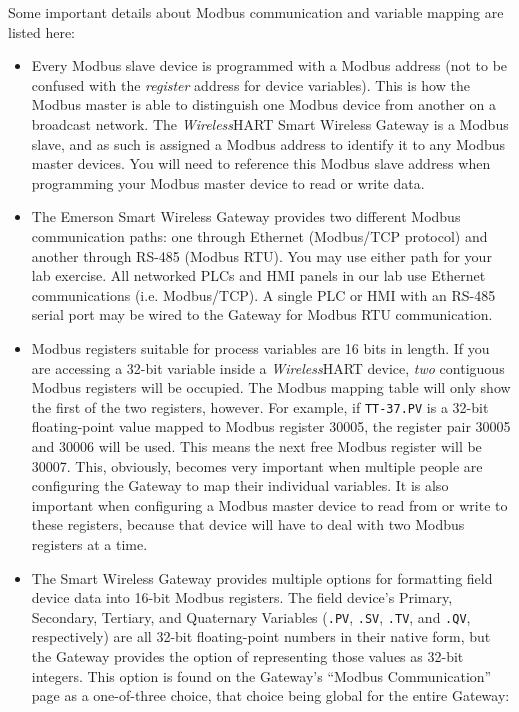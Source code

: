 \vskip 10pt

\filbreak

\noindent
Some important details about Modbus communication and variable mapping are listed here:

\begin{itemize}
\item{} Every Modbus slave device is programmed with a Modbus address (not to be confused with the {\it register} address for device variables).  This is how the Modbus master is able to distinguish one Modbus device from another on a broadcast network.  The {\sl Wireless}HART Smart Wireless Gateway is a Modbus slave, and as such is assigned a Modbus address to identify it to any Modbus master devices.  You will need to reference this Modbus slave address when programming your Modbus master device to read or write data.
\vskip 5pt
\item{} The Emerson Smart Wireless Gateway provides two different Modbus communication paths: one through Ethernet (Modbus/TCP protocol) and another through RS-485 (Modbus RTU).  You may use either path for your lab exercise.  All networked PLCs and HMI panels in our lab use Ethernet communications (i.e. Modbus/TCP).  A single PLC or HMI with an RS-485 serial port may be wired to the Gateway for Modbus RTU communication.
\vskip 5pt
\item{} Modbus registers suitable for process variables are 16 bits in length.  If you are accessing a 32-bit variable inside a {\sl Wireless}HART device, {\it two} contiguous Modbus registers will be occupied.  The Modbus mapping table will only show the first of the two registers, however.  For example, if {\tt TT-37.PV} is a 32-bit floating-point value mapped to Modbus register 30005, the register pair 30005 and 30006 will be used.  This means the next free Modbus register will be 30007.  This, obviously, becomes very important when multiple people are configuring the Gateway to map their individual variables.  It is also important when configuring a Modbus master device to read from or write to these registers, because that device will have to deal with two Modbus registers at a time.
\vskip 5pt
\item{} The Smart Wireless Gateway provides multiple options for formatting field device data into 16-bit Modbus registers.  The field device's Primary, Secondary, Tertiary, and Quaternary Variables ({\tt .PV}, {\tt .SV}, {\tt .TV}, and {\tt .QV}, respectively) are all 32-bit floating-point numbers in their native form, but the Gateway provides the option of representing those values as 32-bit integers.  This option is found on the Gateway's ``Modbus Communication'' page as a one-of-three choice, that choice being global for the entire Gateway:
\begin{itemize}


\end{itemize}
\end{itemize}
